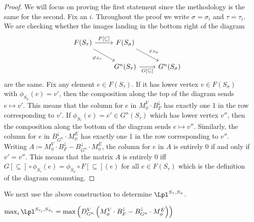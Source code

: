 \begin{proof}
We will focus on proving the first statement since the methodology is the same for the second. 
Fix an $i$.  
Throughout the proof we write $\sigma = \sigma_i$ and $\tau = \tau_i$. 
We are checking whether the images landing in the bottom right of the diagram
 \begin{equation*}
    \begin{tikzcd}
    F(S_{\tau})  
        \ar[r, "{F[\subseteq ]}"] 
        \ar[dr, "\varphi_{S_\tau}"']
    & F(S_\sigma)
        \ar[dr, "\varphi_{ S_\sigma}"]
    & \\
    & G^n(S_\tau) 
        \ar[r, "{G[\subseteq ]}"'] 
    & G^n(S_\sigma)  
    \end{tikzcd}
 \end{equation*}
 are the same. 
 Fix any element $e \in F(S_{\tau})$. 
 If it has lower vertex $v \in F(S_\sigma)$ with $\phi_{S_\sigma}(v) = v'$, then the composition along the top of the diagram sends $e \mapsto v'$. 
 This means that the column for $e$ in $M_{\phi}^V \cdot B_F^{\downarrow}$ has exactly one 1 in the row corresponding to $v'$. 
If $\phi_{S_\tau}(e) = e' \in G^n(S_\tau)$ which has lower vertex $v''$, then the composition along the bottom of the diagram sends $e \mapsto v''$. 
Similarly, the column for $e$ in $B_{G^n}^{\downarrow} \cdot M_{\phi}^E$ has exactly one 1 in the row corresponding to $v''$. 
Writing $A\coloneqq M_{\phi}^V \cdot B_F^{\downarrow} - B_{G^n}^{\downarrow} \cdot M_{\phi}^E$, the column for $e$ in $A$ is entirely 0 if and only if $v' = v''$. 
This means that the matrix $A$ is entirely 0 iff $G[\subseteq]\circ \phi_{S_\tau}(e) =  \phi_{S_\sigma}\circ F[\subseteq](e)$ for all $e \in F(S_\tau)$ which is the definition of the diagram commuting. 
\end{proof}
 

We next use the above construction to determine  $\Lpl^{S_\tau, S_\sigma}$.


 \begin{lemma}
\label{lem:matrix_entries_edge_vert_down}
    $\max_{i} \Lpl^{S_{\tau_i}, S_{\sigma_i}} = \max \left( D_{G^n}^V \left(M_{\phi}^V \cdot B_F^{\downarrow} - B_{G^n}^{\downarrow} \cdot M_{\phi}^E\right) \right)$
\end{lemma}

